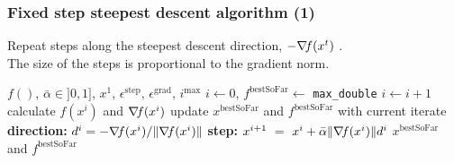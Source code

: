 \documentclass[12pt]{beamer}
\begin{document}
\begin{frame}
\frametitle{Fixed step steepest descent algorithm (1)} 
Repeat steps along the steepest descent direction, $-\nabla\!{f}(x^t)$ \cite{cauchy1847methode,curry1944method}. \\
The size of the steps is proportional to the gradient norm.
\begin{block}{}
\begin{algorithmic}
\REQUIRE $f()$, $\bar\alpha \in ]0,1]$, $x^1$, $\epsilon^{\text{step}}$, $\epsilon^{\text{grad}}$, $i^{\text{max}}$
\STATE $i\leftarrow 0$, $f^{\text{bestSoFar}} \leftarrow $ \texttt{max\_double}
\REPEAT 
\STATE $i \leftarrow i+1$
\STATE calculate $f(x^i)$ and $\nabla\!{f}(x^i)$
\STATE update $x^{\text{bestSoFar}}$ and $f^{\text{bestSoFar}}$ with current iterate
\ENDIF
\STATE \textbf{direction: } $d^i = - \nabla\!{f}(x^i) / \lVert \nabla\!{f}(x^i) \rVert$
\STATE \textbf{step: } $x^{i+1} ~=~ x^i + \bar\alpha \lVert \nabla\!{f}(x^i) \rVert d^i$
\RETURN $x^{\text{bestSoFar}}$ and $f^{\text{bestSoFar}}$
\end{algorithmic}
\end{block}
\end{frame}
\end{document}
